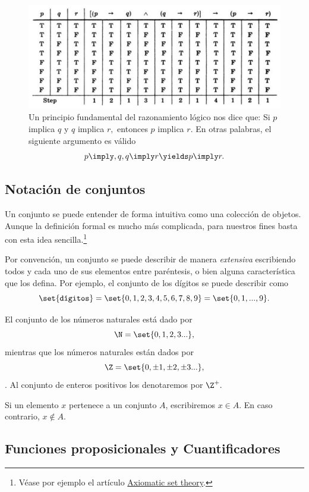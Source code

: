 	\begin{figure}
		\centering
		\includegraphics[width=0.7\linewidth]{md/tabla_silogismo}
		\caption{
			  Un principio fundamental del razonamiento lógico nos dice que:
				Si $p$ implica $q$ y $q$ implica $r,$ entonces $p$ implica $r.$ 
			En otras palabras, el siguiente argumento es válido
			$$
			p\imply,q, q\imply r \yields p \imply r.
			$$ }
		\label{fig:tabla_silogismo}
	\end{figure}

\subsection{Notación de conjuntos}

Un conjunto se puede entender de forma intuitiva como una colección de objetos. Aunque la definición formal es mucho más complicada, para nuestros fines basta con esta idea sencilla.\footnote{Véase por ejemplo el artículo \href{https://www.britannica.com/science/set-theory/Axiomatic-set-theory}{Axiomatic set theory}.}

Por convención, un conjunto se puede describir de manera \emph{extensiva} escribiendo todos y cada uno de sus elementos entre paréntesis, o bien alguna característica que los defina. Por ejemplo, el conjunto de los dígitos se puede describir como
\[
	\set{\texttt{dígitos}}=\set{0,1,2,3,4,5,6,7,8,9}=\set{0,1,...,9}.
\]

	El conjunto de los números naturales está dado por
	\[ \N = \set{0,1,2,3...} ,\]	
	mientras que los números naturales están dados por 
	\[ \Z = \set{0,\pm 1, \pm 2, \pm 3...} ,\].	
	Al conjunto de enteros positivos los denotaremos por $ \Z^{+}. $
	
		Si un elemento $ x $ pertenece a un conjunto $ A $, escribiremos $ x\in A $. En caso contrario, $ x\not \in A $.

\subsection{Funciones proposicionales y Cuantificadores}


